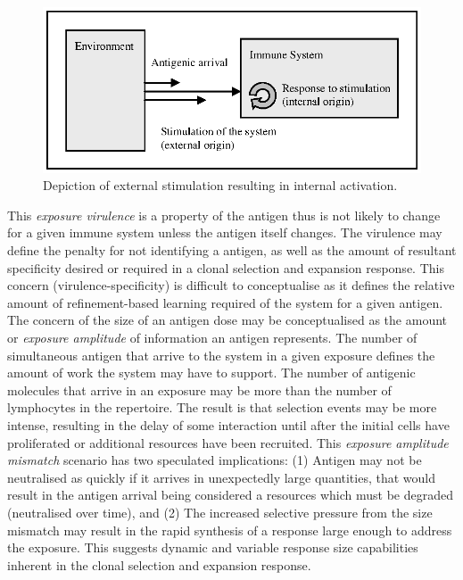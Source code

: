 \begin{figure}[ht]
	\centering
	\includegraphics[scale=0.85]{Cells/antigenic-systemenv}
	\caption{Depiction of external stimulation resulting in internal activation.}
	\label{pic:cells:internalexternal}
\end{figure}

This \emph{exposure virulence} is a property of the antigen thus is not likely to change for a given immune system unless the antigen itself changes. The virulence may define the penalty for not identifying a antigen, as well as the amount of resultant specificity desired or required in a clonal selection and expansion response. This concern (virulence-specificity) is difficult to conceptualise as it defines the relative amount of refinement-based learning required of the system for a given antigen. The concern of the size of an antigen dose may be conceptualised as the amount or \emph{exposure amplitude} of information an antigen represents. The number of simultaneous antigen that arrive to the system in a given exposure defines the amount of work the system may have to support. The number of antigenic molecules that arrive in an exposure may be more than the number of lymphocytes in the repertoire. The result is that selection events may be more intense, resulting in the delay of some interaction until after the initial cells have proliferated or additional resources have been recruited. This \emph{exposure amplitude mismatch} scenario has two speculated implications: (1) Antigen may not be neutralised as quickly if it arrives in unexpectedly large quantities, that would result in the antigen arrival being considered a resources which must be degraded (neutralised over time), and (2) The increased selective pressure from the size mismatch may result in the rapid synthesis of a response large enough to address the exposure. This suggests dynamic and variable response size capabilities inherent in the clonal selection and expansion response. 

